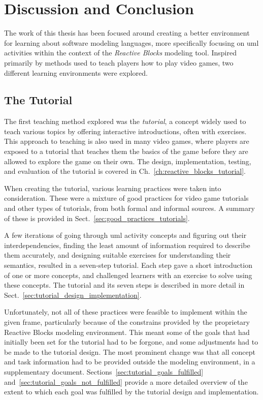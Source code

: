 \chapter{Discussion and Conclusion}
\label{ch:discussion}
The work of this thesis has been focused around creating a better environment for learning about software modeling languages, more specifically focusing on \gls{uml} activities within the context of the \emph{Reactive Blocks} modeling tool. Inspired primarily by methods used to teach players how to play video games, two different learning environments were explored.

\section{The Tutorial}
\label{sec:discussion_tutorial}
The first teaching method explored was the \emph{tutorial}, a concept widely used to teach various topics by offering interactive introductions, often with exercises. This approach to teaching is also used in many video games, where players are exposed to a tutorial that teaches them the basics of the game before they are allowed to explore the game on their own. The design, implementation, testing, and evaluation of the tutorial is covered in Ch.~\ref{ch:reactive_blocks_tutorial}.

\noindent
When creating the tutorial, various learning practices were taken into consideration. These were a mixture of good practices for video game tutorials and other types of tutorials, from both formal and informal sources. A summary of these is provided in Sect.~\ref{sec:good_practices_tutorials}.

\noindent
A few iterations of going through \gls{uml} activity concepts and figuring out their interdependencies, finding the least amount of information required to describe them accurately, and designing suitable exercises for understanding their semantics, resulted in a seven-step tutorial. Each step gave a short introduction of one or more concepts, and challenged learners with an exercise to solve using these concepts. The tutorial and its seven steps is described in more detail in Sect.~\ref{sec:tutorial_design_implementation}.

\noindent
Unfortunately, not all of these practices were feasible to implement within the given frame, particularly because of the constrains provided by the proprietary Reactive Blocks modeling environment. This meant some of the goals that had initially been set for the tutorial had to be forgone, and some adjustments had to be made to the tutorial design. The most prominent change was that all concept and task information had to be provided outside the modeling environment, in a supplementary document. Sections~\ref{sec:tutorial_goals_fulfilled} and~\ref{sec:tutorial_goals_not_fulfilled} provide a more detailed overview of the extent to which each goal was fulfilled by the tutorial design and implementation.

